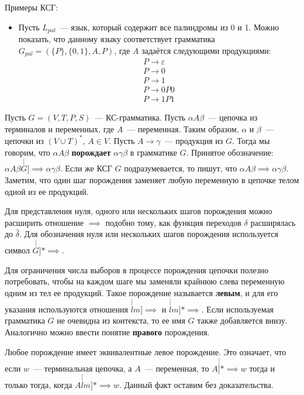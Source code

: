 \documentclass[a4paper,12pt]{article}
\begin{document}
	Примеры КСГ:
	\begin{itemize}
		\item Пусть \(L_{pal}\)~--- язык, который содержит все палиндромы из 0 и 1. Можно показать, что данному языку соответствует грамматика \(G_{pal} = (\{P\}, \{0, 1\}, A, P)\), где \(A\) задаётся следующими продукциями: 
		\[\begin{array}{c}
		P \to \varepsilon \\
		P \to 0 \\
		P \to 1 \\
		P \to 0P0 \\
		P \to 1P1
		\end{array}\]
	\end{itemize}
	
	Пусть \(G = (V, T, P, S)\)~--- КС-грамматика. Пусть \(\alpha A \beta\)~--- цепочка из терминалов и переменных, где \(A\)~--- переменная. Таким образом, \(\alpha\) и \(\beta\)~--- цепочки из \((V \cup T)^*\), \(A \in V\). Пусть \(A \to \gamma\)~--- продукция из \(G\). Тогда мы говорим, что \(\alpha A \beta\) \textbf{порождает} \(\alpha \gamma \beta\) в грамматике \(G\). Принятое обозначение: \(\alpha A \beta \stackrel[G]{}{\implies} \alpha \gamma \beta\). Если же КСГ \(G\) подразумевается, то пишут, что \(\alpha A \beta \implies \alpha \gamma \beta\). Заметим, что один шаг порождения заменяет любую переменную в цепочке телом одной из ее продукций.
	
	Для представления нуля, одного или нескольких шагов порождения можно расширить отношение \(\implies\) подобно тому, как функция переходов \(\delta\) расширялась до \(\hat{\delta}\). Для обозначения нуля или нескольких шагов порождения используется символ \(\stackrel[G]{*}{\implies}\).
	
	Для ограничения числа выборов в процессе порождения цепочки полезно потребовать, чтобы на каждом шаге мы заменяли крайнюю слева переменную одним из тел ее продукций. Такое порождение называется \textbf{левым}, и для его указания используются отношения \(\stackrel[lm]{}{\implies}\) и \(\stackrel[lm]{*}{\implies}\). Если используемая грамматика \(G\) не очевидна из контекста, то ее имя \(G\) также добавляется внизу. Аналогично можно ввести понятие \textbf{правого} порождения.
	
	Любое порождение имеет эквивалентные левое  порождение. Это означает, что если \(w\)~--- терминальная цепочка, а \(A\)~--- переменная, то \(A \stackrel[]{*}{\implies} w\) тогда и только тогда, когда \(A \stackrel[lm]{*}{\implies} w\). Данный факт оставим без доказательства. 
	
\end{document}
